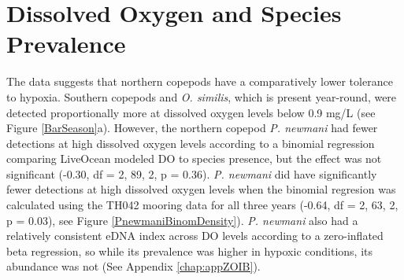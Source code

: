 \documentclass[12pt,twoside]{reedthesis}
\begin{document}
	\section{Dissolved Oxygen and Species Prevalence} 
	
	The data suggests that northern copepods have a comparatively lower tolerance to hypoxia. Southern copepods and \textit{O. similis}, which is present year-round, were detected proportionally more at dissolved oxygen levels below 0.9 mg/L (see Figure \ref{BarSeason}a). However, the northern copepod \textit{P. newmani} had fewer detections at high dissolved oxygen levels according to a binomial regression comparing LiveOcean modeled DO to species presence, but the effect was not significant (-0.30, df = 2, 89, 2, p = 0.36). \textit{P. newmani} did have significantly fewer detections at high dissolved oxygen levels when the binomial regresion was calculated using the TH042 mooring data for all three years (-0.64, df = 2, 63, 2, p = 0.03), see Figure \ref{PnewmaniBinomDensity}). \textit{P. newmani} also had a relatively consistent eDNA index across DO levels according to a zero-inflated beta regression, so while its prevalence was higher in hypoxic conditions, its abundance was not (See Appendix \ref{chap:appZOIB}). 
	
\end{document}
